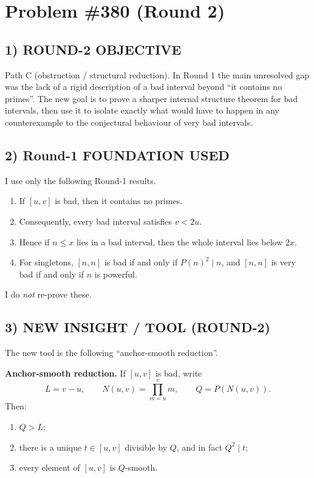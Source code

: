 
\section{Problem \#380 (Round 2)}

\subsection*{1) ROUND-2 OBJECTIVE}

Path C (obstruction / structural reduction). In Round 1 the main unresolved gap was the lack of a rigid description of a bad interval beyond ``it contains no primes''. The new goal is to prove a sharper internal structure theorem for bad intervals, then use it to isolate exactly what would have to happen in any counterexample to the conjectural behaviour of very bad intervals.

\subsection*{2) Round-1 FOUNDATION USED}

I use only the following Round-1 results.

\begin{enumerate}
\item If $[u,v]$ is bad, then it contains no primes.
\item Consequently, every bad interval satisfies $v<2u$.
\item Hence if $n\le x$ lies in a bad interval, then the whole interval lies below $2x$.
\item For singletons, $[n,n]$ is bad if and only if $P(n)^2\mid n$, and $[n,n]$ is very bad if and only if $n$ is powerful.
\end{enumerate}

I do \emph{not} re-prove these.

\subsection*{3) NEW INSIGHT / TOOL (ROUND-2)}

The new tool is the following ``anchor-smooth reduction''.

\medskip

\noindent\textbf{Anchor-smooth reduction.}
If $[u,v]$ is bad, write
\[
L=v-u,\qquad N(u,v)=\prod_{m=u}^{v}m,\qquad Q=P(N(u,v)).
\]
Then:
\begin{enumerate}
\item $Q>L$;
\item there is a unique $t\in [u,v]$ divisible by $Q$, and in fact $Q^2\mid t$;
\item every element of $[u,v]$ is $Q$-smooth.
\end{enumerate}

